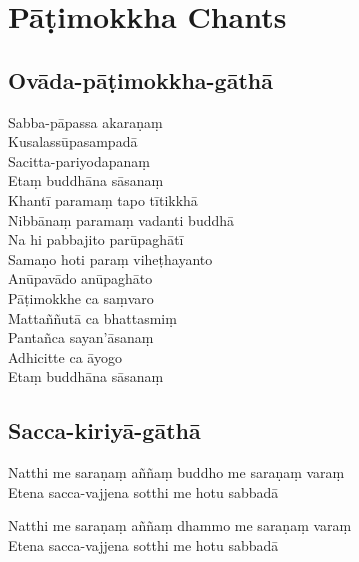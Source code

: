 \chapter{Pāṭimokkha Chants}

\section{Ovāda-pāṭimokkha-gāthā}


\begin{leader}
\end{leader}


Sabba-pāpassa akaraṇaṃ\\
Kusalassūpasampadā\\
Sacitta-pariyodapanaṃ\\
Etaṃ buddhāna sāsanaṃ\\
Khantī paramaṃ tapo tītikkhā\\
Nibbānaṃ paramaṃ vadanti buddhā\\
Na hi pabbajito parūpaghātī\\
Samaṇo hoti paraṃ viheṭhayanto\\
Anūpavādo anūpaghāto\\
Pāṭimokkhe ca saṃvaro\\
Mattaññutā ca bhattasmiṃ\\
Pantañca sayan'āsanaṃ\\
Adhicitte ca āyogo\\
Etaṃ buddhāna sāsanaṃ


\clearpage

\section{Sacca-kiriyā-gāthā}

\begin{leader}
\end{leader}


Natthi me saraṇaṃ aññaṃ buddho me saraṇaṃ varaṃ\\
Etena sacca-vajjena sotthi me hotu sabbadā

Natthi me saraṇaṃ aññaṃ dhammo me saraṇaṃ varaṃ\\
Etena sacca-vajjena sotthi me hotu sabbadā

